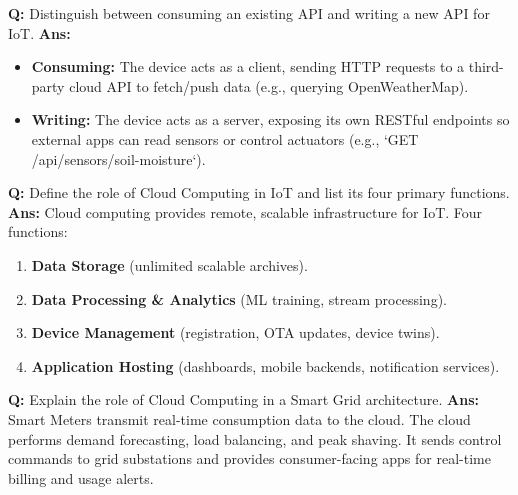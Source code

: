 \documentclass[10pt,a4paper,twocolumn]{article}
\begin{document}
\begin{tcolorbox}[
  colback=white,
  colframe=UnitColorSeven,
  colbacktitle=gray!10!white,
  coltitle=black,
  fonttitle=\bfseries\sffamily\small,
  title={Unit VII $\bullet$ Card 2},
  boxrule=1.2pt,
  arc=2mm,
  outer arc=2mm,
  boxsep=1.5mm,
  top=1mm,
  bottom=1mm,
  left=1.5mm,
  right=1.5mm,
  before skip=2.5mm,
  after skip=2.5mm
]
\textbf{Q:} Distinguish between consuming an existing API and writing a new API for IoT.
\tcbline
\textbf{Ans:} \begin{itemize}
  \item \textbf{Consuming:} The device acts as a client, sending HTTP requests to a third-party cloud API to fetch/push data (e.g., querying OpenWeatherMap).
  \item \textbf{Writing:} The device acts as a server, exposing its own RESTful endpoints so external apps can read sensors or control actuators (e.g., `GET /api/sensors/soil-moisture`).
\end{itemize}
\end{tcolorbox}


\begin{tcolorbox}[
  colback=white,
  colframe=UnitColorSeven,
  colbacktitle=gray!10!white,
  coltitle=black,
  fonttitle=\bfseries\sffamily\small,
  title={Unit VII $\bullet$ Card 3},
  boxrule=1.2pt,
  arc=2mm,
  outer arc=2mm,
  boxsep=1.5mm,
  top=1mm,
  bottom=1mm,
  left=1.5mm,
  right=1.5mm,
  before skip=2.5mm,
  after skip=2.5mm
]
\textbf{Q:} Define the role of Cloud Computing in IoT and list its four primary functions.
\tcbline
\textbf{Ans:} Cloud computing provides remote, scalable infrastructure for IoT. Four functions:  
\begin{enumerate}
  \item \textbf{Data Storage} (unlimited scalable archives).
  \item \textbf{Data Processing \& Analytics} (ML training, stream processing).
  \item \textbf{Device Management} (registration, OTA updates, device twins).
  \item \textbf{Application Hosting} (dashboards, mobile backends, notification services).
\end{enumerate}
\end{tcolorbox}


\begin{tcolorbox}[
  colback=white,
  colframe=UnitColorSeven,
  colbacktitle=gray!10!white,
  coltitle=black,
  fonttitle=\bfseries\sffamily\small,
  title={Unit VII $\bullet$ Card 4},
  boxrule=1.2pt,
  arc=2mm,
  outer arc=2mm,
  boxsep=1.5mm,
  top=1mm,
  bottom=1mm,
  left=1.5mm,
  right=1.5mm,
  before skip=2.5mm,
  after skip=2.5mm
]
\textbf{Q:} Explain the role of Cloud Computing in a Smart Grid architecture.
\tcbline
\textbf{Ans:} Smart Meters transmit real-time consumption data to the cloud. The cloud performs demand forecasting, load balancing, and peak shaving. It sends control commands to grid substations and provides consumer-facing apps for real-time billing and usage alerts.
\end{tcolorbox}
\end{document}
